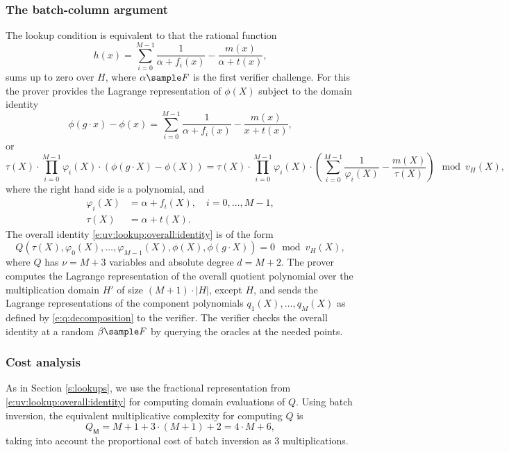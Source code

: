 \subsubsection{The batch-column argument}
The lookup condition is equivalent to that the rational function
\begin{equation}
\label{e:lookup:h}
h(x) = \sum_{i=0}^{M-1} \frac{1}{\alpha + f_i(x)} - \frac{m(x)}{\alpha + t(x)},
\end{equation}
sums up to zero over $H$, where $\alpha\sample F$ is the first verifier challenge.
For this the prover provides the Lagrange representation of $\phi(X)$ subject to the domain identity
\[
\phi(g\cdot x) - \phi(x) = \sum_{i=0}^{M-1} \frac{1}{\alpha + f_i(x)} - \frac{m(x)}{x + t(x)},
\]
or 
\begin{equation}
\label{e:uv:lookup:overall:identity}
 \tau(X) \cdot
\prod_{i=0}^{M-1} \varphi_i(X) \cdot (\phi(g\cdot X) - \phi(X))= 
 \tau(X) \cdot \prod_{i=0}^{M-1} \varphi_i(X)\cdot \left(\sum_{i=0}^{M-1} \frac{1}{\varphi_i(X)} - \frac{m(X)}{\tau(X)}\right) \mod v_H(X),
\end{equation}
where the right hand side is a polynomial, and 
\begin{align*}
\varphi_i(X) &= \alpha + f_i(X), \quad i=0,\ldots, M-1,
\\
 \tau(X) &= \alpha + t(X).
\end{align*}
The overall identity \eqref{e:uv:lookup:overall:identity} is of the form
\[
Q(\tau(X), \varphi_0(X), \ldots, \varphi_{M-1}(X), \phi(X), \phi(g\cdot X)) = 0 \mod v_H(X),
\]
where $Q$ has $\nu = M + 3$ variables and absolute degree $d= M + 2$. 
The prover computes the Lagrange representation of the overall quotient polynomial over the multiplication domain $H'$ of size $(M + 1)\cdot |H|$, except $H$,
and sends the Lagrange representations of the component polynomials $q_1(X),\ldots, q_{M}(X)$ as defined by \eqref{e:q:decomposition} to the verifier.
The verifier checks the overall identity at a random $\beta\sample F$ by querying the oracles at the needed points.

\subsubsection{Cost analysis}

As in Section \ref{s:lookups}, we use the fractional representation from \eqref{e:uv:lookup:overall:identity} for computing domain evaluations of $Q$. 
Using batch inversion, the equivalent multiplicative complexity for computing $Q$ is 
\[
Q_\mathsf M = M + 1 + 3\cdot (M+1) + 2 = 4\cdot M + 6,
\] 
taking into account the proportional cost of batch inversion as $3$ multiplications.  

